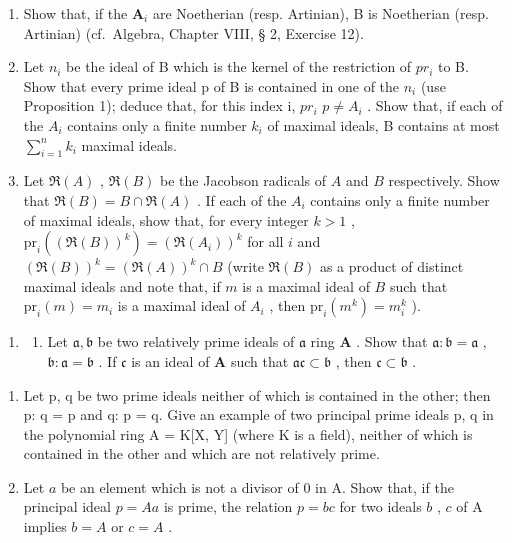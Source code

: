 \begin{enumerate}
\def\labelenumi{(\alph{enumi})}
\item
  Show that, if the \(\mathbf{A}_i\) are Noetherian (resp. Artinian), B is Noetherian (resp. Artinian) (cf.~Algebra, Chapter VIII, § 2, Exercise 12).
\item
  Let \(n_{i}\) be the ideal of B which is the kernel of the restriction of \(pr_{i}\) to B. Show that every prime ideal p of B is contained in one of the \(n_{i}\) (use Proposition 1); deduce that, for this index i, \(pr_{i}\) \(p \neq A_{i}\) . Show that, if each of the \(A_{i}\) contains only a finite number \(k_{i}\) of maximal ideals, B contains at most \(\sum_{i=1}^{n} k_{i}\) maximal ideals.
\item
  Let \(\Re(A)\) , \(\Re(B)\) be the Jacobson radicals of \(A\) and \(B\) respectively. Show that \(\Re(B) = B \cap \Re(A)\) . If each of the \(A_i\) contains only a finite number of maximal ideals, show that, for every integer \(k > 1\) , \(\mathrm{pr}_i((\Re(B))^k) = (\Re(A_i))^k\) for all \(i\) and \((\Re(B))^k = (\Re(A))^k \cap B\) (write \(\Re(B)\) as a product of distinct maximal ideals and note that, if \(m\) is a maximal ideal of \(B\) such that \(\mathrm{pr}_i(m) = m_i\) is a maximal ideal of \(A_i\) , then \(\mathrm{pr}_i(m^k) = m_i^k\) ).
\end{enumerate}

\begin{enumerate}
\def\labelenumi{\arabic{enumi}.}
\setcounter{enumi}{7}
\tightlist
\item
  \begin{enumerate}
  \def\labelenumii{(\alph{enumii})}
  \tightlist
  \item
    Let \(\mathfrak{a}, \mathfrak{b}\) be two relatively prime ideals of \(\mathfrak{a}\) ring \(\mathbf{A}\) . Show that \(\mathfrak{a}: \mathfrak{b} = \mathfrak{a}\) , \(\mathfrak{b}: \mathfrak{a} = \mathfrak{b}\) . If \(\mathfrak{c}\) is an ideal of \(\mathbf{A}\) such that \(\mathfrak{ac} \subset \mathfrak{b}\) , then \(\mathfrak{c} \subset \mathfrak{b}\) .
  \end{enumerate}
\end{enumerate}

\begin{enumerate}
\def\labelenumi{(\alph{enumi})}
\setcounter{enumi}{1}
\item
  Let p, q be two prime ideals neither of which is contained in the other; then p: q = p and q: p = q. Give an example of two principal prime ideals p, q in the polynomial ring A = K{[}X, Y{]} (where K is a field), neither of which is contained in the other and which are not relatively prime.
\item
  Let \(a\) be an element which is not a divisor of 0 in A. Show that, if the principal ideal \(p = Aa\) is prime, the relation \(p = bc\) for two ideals \(b\) , \(c\) of A implies \(b = A\) or \(c = A\) .
\end{enumerate}

